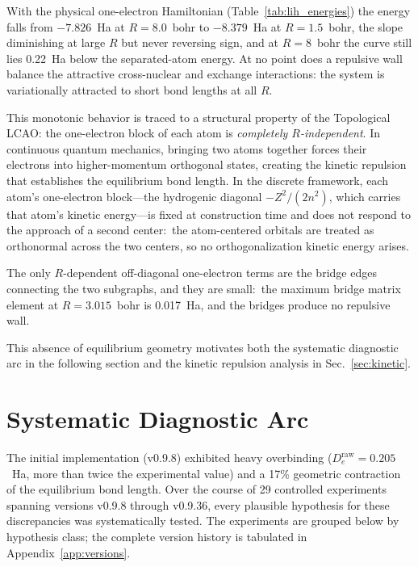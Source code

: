 \documentclass[aps,pra,twocolumn,superscriptaddress,longbibliography]{revtex4-2}
\begin{document}
With the physical one-electron Hamiltonian (Table~\ref{tab:lih_energies})
the energy falls from $-7.826$~Ha at $R=8.0$~bohr to $-8.379$~Ha at
$R=1.5$~bohr, the slope diminishing at large $R$ but never reversing
sign, and at $R=8$~bohr the curve still lies 0.22~Ha below the
separated-atom energy.  At no point does a repulsive wall balance the
attractive cross-nuclear and exchange interactions: the system is
variationally attracted to short bond lengths at all $R$.

This monotonic behavior is traced to a structural property of the
Topological LCAO: the one-electron block of each atom is
\emph{completely $R$-independent}.  In continuous quantum
mechanics, bringing two atoms together forces their electrons into
higher-momentum orthogonal states, creating the kinetic repulsion that
establishes the equilibrium bond length.  In the discrete framework,
each atom's one-electron block---the hydrogenic diagonal $-Z^2/(2n^2)$,
which carries that atom's kinetic energy---is fixed at construction time
and does not respond to the approach of a second center:\ the
atom-centered orbitals are treated as orthonormal across the two
centers, so no orthogonalization kinetic energy arises.

The only $R$-dependent off-diagonal one-electron terms are the bridge
edges connecting the two subgraphs, and they are small:\ the maximum
bridge matrix element at $R=3.015$~bohr is 0.017~Ha, and the bridges
produce no repulsive wall.

This absence of equilibrium geometry motivates both the systematic
diagnostic arc in the following section and the kinetic repulsion
analysis in Sec.~\ref{sec:kinetic}.

\section{Systematic Diagnostic Arc}
\label{sec:diagnostic}

The initial implementation (v0.9.8) exhibited heavy overbinding
($D_e^{\mathrm{raw}} = 0.205$~Ha, more than twice the experimental
value) and a 17\% geometric contraction of the equilibrium bond length.
Over the course of 29 controlled experiments spanning versions v0.9.8
through v0.9.36, every plausible hypothesis for these discrepancies was
systematically tested.  The experiments are grouped below by hypothesis
class; the complete version history is tabulated in
Appendix~\ref{app:versions}.
\end{document}
